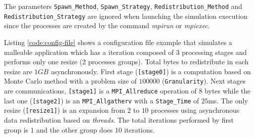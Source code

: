 The parameters \texttt{Spawn\_Method}, \texttt{Spawn\_Strategy}, \texttt{Redistribution\_Method} and \texttt{Redistribution\_Strategy} are ignored when launching the simulation execution since the processes are created  %
by the command  \textit{mpirun} or \textit{mpiexec}.


Listing \ref{code:config-file} shows a configuration file example that simulates a malleable application which has a iteration composed of $3$ processing stages and performs only one resize 
(2 processes groups). Total bytes to redistribute in each resize are $1GB$ asynchronously. First stage (\texttt{[stage0]}) is a computation  based on Monte Carlo method with a problem size of $100000$ (\texttt{Granularity}). Next stages are communications, \texttt{[stage1]} is a \texttt{MPI\_Allreduce} operation of $8$ bytes while the last one (\texttt{[stage2]}) is an \texttt{MPI\_Allgatherv} with a \texttt{Stage\_Time} of $25$ms.
The only resize (\texttt{[resize1]}) is an expansion from $2$ to $10$ processes using asynchronous data redistribution based on \textit{threads}. The total iterations performed by first group is $1$ and the other group does $10$ iterations. 

